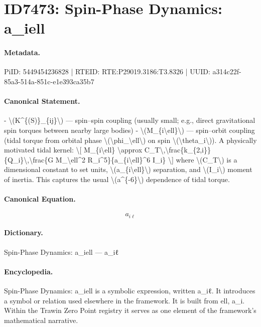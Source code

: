 \section*{ID7473: Spin-Phase Dynamics: a\_iell}
\paragraph{Metadata.}
PiID: 5449454236828 | RTEID: RTE:P29019.3186:T3.8326 | UUID: a314c22f-85a3-514a-851c-e1e393ca35b7

\paragraph{Canonical Statement.}
- \textbackslash{}(K\textasciicircum{}\{(S)\}\_\{ij\}\textbackslash{}) — spin–spin coupling (usually small; e.g., direct gravitational spin torques between nearby large bodies) - \textbackslash{}(M\_\{i\textbackslash{}ell\}\textbackslash{}) — spin–orbit coupling (tidal torque from orbital phase \textbackslash{}(\textbackslash{}phi\_\textbackslash{}ell\textbackslash{}) on spin \textbackslash{}(\textbackslash{}theta\_i\textbackslash{})). A physically motivated tidal kernel: \textbackslash{}[ M\_\{i\textbackslash{}ell\} \textbackslash{}approx C\_T\textbackslash{},\textbackslash{}frac\{k\_\{2,i\}\}\{Q\_i\}\textbackslash{},\textbackslash{}frac\{G M\_\textbackslash{}ell\textasciicircum{}2 R\_i\textasciicircum{}5\}\{a\_\{i\textbackslash{}ell\}\textasciicircum{}6 I\_i\} \textbackslash{}] where \textbackslash{}(C\_T\textbackslash{}) is a dimensional constant to set units, \textbackslash{}(a\_\{i\textbackslash{}ell\}\textbackslash{}) separation, and \textbackslash{}(I\_i\textbackslash{}) moment of inertia. This captures the usual \textbackslash{}(a\textasciicircum{}\{-6\}\textbackslash{}) dependence of tidal torque.

\paragraph{Canonical Equation.}
\[
a_{i\ell}
\]

\paragraph{Dictionary.}
Spin-Phase Dynamics: a\_iell — a\_iℓ

\paragraph{Encyclopedia.}
Spin-Phase Dynamics: a\_iell is a symbolic expression, written a\_iℓ. It introduces a symbol or relation used elsewhere in the framework. It is built from ell, a\_i. Within the Trawin Zero Point registry it serves as one element of the framework's mathematical narrative.
